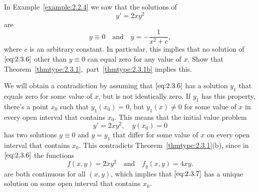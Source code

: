 \documentclass{ximera}
\begin{document}
\begin{example}\label{example:2.3.4}
In Example~\ref{example:2.2.4} we saw that the
solutions of
\begin{equation} \label{eq:2.3.6}
y'=2xy^2
\end{equation}
are
 $$
y\equiv0 \quad\mbox{and}\quad  y=-\frac{1}{x^2+c},
$$
where $c$ is an arbitrary constant. In particular, this implies that
no solution of $\eqref{eq:2.3.6}$ other than $y\equiv0$ can equal zero for
any value of $x$. Show that Theorem~\ref{thmtype:2.3.1},~part~\ref{thmtype:2.3.1b} implies
this.

\begin{explanation}
We will obtain a contradiction
by assuming that $\eqref{eq:2.3.6}$ has a solution $y_1$ that equals
zero for some value of $x$, but is not identically zero. If $y_1$
has this property,  there's a point $x_0$ such that $y_1(x_0)=0$,
but $y_1(x)\neq0$ for some value of $x$ in every open interval that contains
$x_0$. This means that the initial value problem
\begin{equation} \label{eq:2.3.7}
y'=2xy^2,\quad y(x_0)=0
\end{equation}
has two solutions $y\equiv0$ and $y=y_1$ that differ for some value of
$x$ on every open interval that contains $x_0$. This contradicts
Theorem~\ref{thmtype:2.3.1}(b), since in $\eqref{eq:2.3.6}$ the functions
$$
f(x,y)=2xy^2  \quad\mbox{and}\quad  f_y(x,y)= 4xy.
$$
are both continuous
for all $(x,y)$, which implies that $\eqref{eq:2.3.7}$ has a unique
solution on some open interval that contains $x_0$.
\end{explanation}
\end{example}
\end{document}
